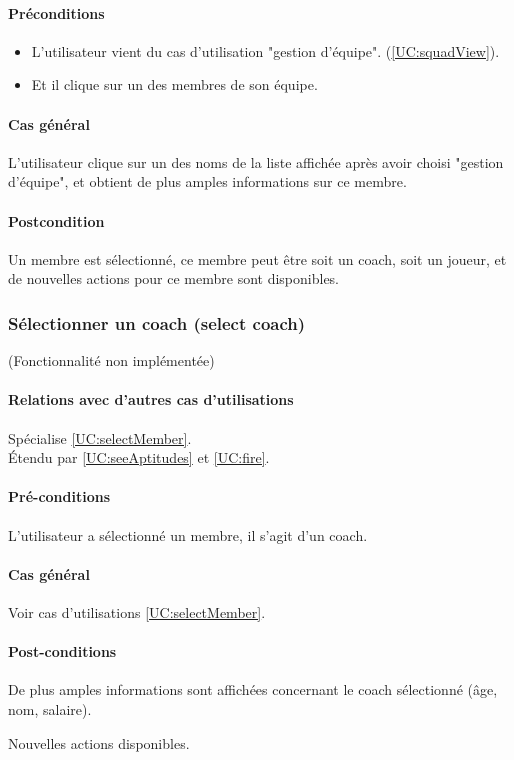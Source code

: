 \paragraph{Préconditions}
\begin{itemize}
	\item L'utilisateur vient du cas d'utilisation "gestion d'équipe".
		  (\ref{UC:squadView}).
	\item Et il clique sur un des membres de son équipe.
\end{itemize}
\paragraph{Cas général}
L'utilisateur clique sur un des noms de la liste affichée après avoir choisi "gestion d'équipe", et obtient de plus amples informations sur ce membre. 
\paragraph{Postcondition}
Un membre est sélectionné, ce membre peut être soit un coach, soit un joueur, 
et de nouvelles actions pour ce membre sont disponibles.

\subsubsection{Sélectionner un coach (select coach)} 
\label{UC:selectCoach}
(Fonctionnalité non implémentée)
\paragraph{Relations avec d'autres cas d'utilisations}
Spécialise \ref{UC:selectMember}.\\
Étendu par \ref{UC:seeAptitudes} et \ref{UC:fire}.\\
\paragraph{Pré-conditions}
\begin{list}{}{\leftmargin=1.5em}
\item{L'utilisateur a sélectionné un membre, il s'agit d'un coach.}
\end{list}
\paragraph{Cas général}
Voir cas d'utilisations \ref{UC:selectMember}.
\paragraph{Post-conditions}
\begin{list}{}{\leftmargin=1.5em}
\item{De plus amples informations sont affichées concernant le coach sélectionné (âge, nom, salaire).}
\item{Nouvelles actions disponibles.}
\end{list}


